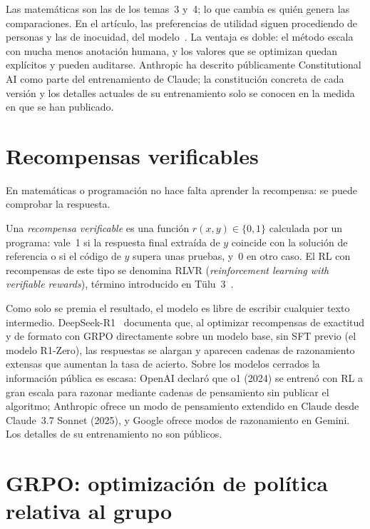 \addtocounter{figure}{1}%

Las matemáticas son las de los temas~3 y~4; lo que cambia es quién genera las comparaciones. En el artículo, las preferencias de utilidad siguen procediendo de personas y las de inocuidad, del modelo~\cite{cai}. La ventaja es doble: el método escala con mucha menos anotación humana, y los valores que se optimizan quedan explícitos y pueden auditarse. Anthropic ha descrito públicamente Constitutional AI como parte del entrenamiento de Claude; la constitución concreta de cada versión y los detalles actuales de su entrenamiento solo se conocen en la medida en que se han publicado.

\section{Recompensas verificables}

En matemáticas o programación no hace falta aprender la recompensa: se puede comprobar la respuesta.

\begin{definicion}\label{def:rlvr}
Una \emph{recompensa verificable} es una función $r(x,y)\in\{0,1\}$ calculada por un programa: vale~1 si la respuesta final extraída de $y$ coincide con la solución de referencia o si el código de $y$ supera unas pruebas, y~0 en otro caso. El RL con recompensas de este tipo se denomina RLVR (\emph{reinforcement learning with verifiable rewards}), término introducido en Tülu~3~\cite{tulu3}.
\end{definicion}

Como solo se premia el resultado, el modelo es libre de escribir cualquier texto intermedio. DeepSeek-R1~\cite{r1} documenta que, al optimizar recompensas de exactitud y de formato con GRPO directamente sobre un modelo base, sin SFT previo (el modelo R1-Zero), las respuestas se alargan y aparecen cadenas de razonamiento extensas que aumentan la tasa de acierto. Sobre los modelos cerrados la información pública es escasa: OpenAI declaró que o1 (2024) se entrenó con RL a gran escala para razonar mediante cadenas de pensamiento sin publicar el algoritmo; Anthropic ofrece un modo de pensamiento extendido en Claude desde Claude~3.7 Sonnet (2025), y Google ofrece modos de razonamiento en Gemini. Los detalles de su entrenamiento no son públicos.

\section{GRPO: optimización de política relativa al grupo}

